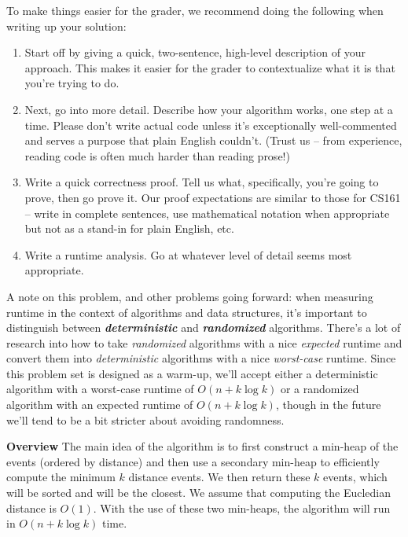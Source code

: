 \documentclass[12pt]{exam}
\newcommand*{\bigo}[1]{O \left( #1 \right)}
\newcommand{\bi}[1]{\textit{\textbf{#1}}}
\begin{document}
\begin{questions}
To make things easier for the grader, we recommend doing the following when writing up your solution:
\begin{enumerate}
    \item Start off by giving a quick, two-sentence, high-level description of your approach. This makes it easier for the grader to contextualize what it is that you're trying to do. 
    \item Next, go into more detail. Describe how your algorithm works, one step at a time. Please don't write actual code unless it's exceptionally well-commented and serves a purpose that plain English couldn't. (Trust us -- from experience, reading code is often much harder than reading prose!)
    \item Write a quick correctness proof. Tell us what, specifically, you're going to prove, then go prove it. Our proof expectations are similar to those for CS161 -- write in complete sentences, use mathematical notation when appropriate but not as a stand-in for plain English, etc. 
    \item Write a runtime analysis. Go at whatever level of detail seems most appropriate.
\end{enumerate}

A note on this problem, and other problems going forward: when measuring runtime in the context of algorithms and data structures, it's important to distinguish between \bi{deterministic} and \bi{randomized} algorithms. There's a lot of research into how to take \emph{randomized} algorithms with a nice \emph{expected} runtime and convert them into \emph{deterministic} algorithms with a nice \emph{worst-case} runtime. Since this problem set is designed as a warm-up, we'll accept either a deterministic algorithm with a worst-case runtime of $O(n + k \log k)$ or a randomized algorithm with an expected runtime of $\bigo{n + k \log k}$, though in the future we'll tend to be a bit stricter about avoiding randomness.

\begin{solution}

\textbf{Overview}
The main idea of the algorithm is to first construct a min-heap of the events (ordered by distance) and then use a secondary min-heap to efficiently compute the minimum $k$ distance events. We then return these $k$ events, which will be sorted and will be the closest. We assume that computing the Eucledian distance is $\bigo{1}$. With the use of these two min-heaps, the algorithm will run in $\bigo{n + k \log k}$ time. 


\end{solution}
\end{questions}
\end{document}
